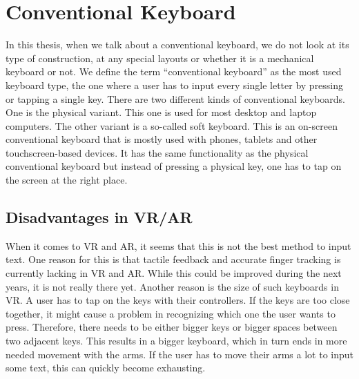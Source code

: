 \section{Conventional Keyboard}
In this thesis, when we talk about a conventional keyboard, we do not look at its type of construction, at any special layouts or whether it is a mechanical keyboard or not. We define the term ``conventional keyboard'' as the most used keyboard type, the one where a user has to input every single letter by pressing or tapping a single key. There are two different kinds of conventional keyboards. One is the physical variant. This one is used for most desktop and laptop computers. The other variant is a so-called soft keyboard. This is an on-screen conventional keyboard that is mostly used with phones, tablets and other touchscreen-based devices. It has the same functionality as the physical conventional keyboard but instead of pressing a physical key, one has to tap on the screen at the right place.

\subsection{Disadvantages in VR/AR}
When it comes to VR and AR, it seems that this is not the best method to input text. One reason for this is that tactile feedback and accurate finger tracking is currently lacking in VR and AR. While this could be improved during the next years, it is not really there yet. Another reason is the size of such keyboards in VR. A user has to tap on the keys with their controllers. If the keys are too close together, it might cause a problem in recognizing which one the user wants to press. Therefore, there needs to be either bigger keys or bigger spaces between two adjacent keys. This results in a bigger keyboard, which in turn ends in more needed movement with the arms. If the user has to move their arms a lot to input some text, this can quickly become exhausting.

